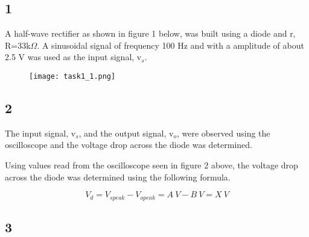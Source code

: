 \subsection*{1}

    A half-wave rectifier as shown in figure 1 below, was built using a  diode and r, R=33k$\Omega$.
    A sinusoidal signal of frequency 100 Hz and with a amplitude of about 2.5 V was used as the input signal, v$_s$.\\

    \begin{figure}[h!]
        \centering
        \texttt{[image: task1\_1.png]}
    \end{figure}

\subsection*{2}

    The input signal, v$_s$, and the output signal, v$_o$, were observed using the oscilloscope and the voltage drop across the diode was determined.\\

    \begin{figure}[h!]
        \centering
    \end{figure}

    Using values read from the oscilloscope seen in figure 2 above, the voltage drop across the diode was determined using the following formula.

    $$V_d = V_{s peak} - V_{o peak} = A\ V - B\ V = X\ V$$

\subsection*{3}

